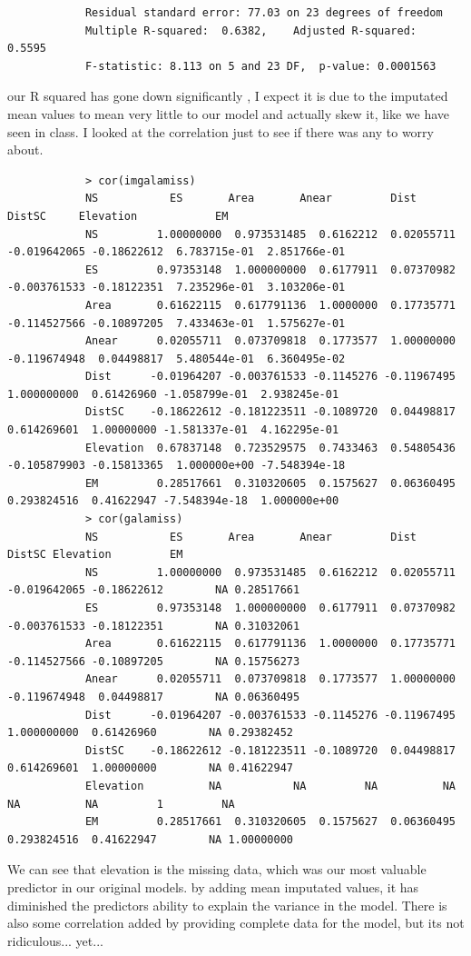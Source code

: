 \documentclass[11pt]{article}
\begin{document}
\begin{enumerate}
\begin{enumerate}
\begin{enumerate}
\begin{verbatim}
			Residual standard error: 77.03 on 23 degrees of freedom
			Multiple R-squared:  0.6382,	Adjusted R-squared:  0.5595 
			F-statistic: 8.113 on 5 and 23 DF,  p-value: 0.0001563
		\end{verbatim}
		our R squared has gone down significantly , I expect it is due to the imputated mean values to mean very little to our model and actually skew it, like we have seen in class.
		I looked at the correlation just to see if there was any to worry about.
		\begin{verbatim}
			> cor(imgalamiss)
			NS           ES       Area       Anear         Dist      DistSC     Elevation            EM
			NS         1.00000000  0.973531485  0.6162212  0.02055711 -0.019642065 -0.18622612  6.783715e-01  2.851766e-01
			ES         0.97353148  1.000000000  0.6177911  0.07370982 -0.003761533 -0.18122351  7.235296e-01  3.103206e-01
			Area       0.61622115  0.617791136  1.0000000  0.17735771 -0.114527566 -0.10897205  7.433463e-01  1.575627e-01
			Anear      0.02055711  0.073709818  0.1773577  1.00000000 -0.119674948  0.04498817  5.480544e-01  6.360495e-02
			Dist      -0.01964207 -0.003761533 -0.1145276 -0.11967495  1.000000000  0.61426960 -1.058799e-01  2.938245e-01
			DistSC    -0.18622612 -0.181223511 -0.1089720  0.04498817  0.614269601  1.00000000 -1.581337e-01  4.162295e-01
			Elevation  0.67837148  0.723529575  0.7433463  0.54805436 -0.105879903 -0.15813365  1.000000e+00 -7.548394e-18
			EM         0.28517661  0.310320605  0.1575627  0.06360495  0.293824516  0.41622947 -7.548394e-18  1.000000e+00
			> cor(galamiss)
			NS           ES       Area       Anear         Dist      DistSC Elevation         EM
			NS         1.00000000  0.973531485  0.6162212  0.02055711 -0.019642065 -0.18622612        NA 0.28517661
			ES         0.97353148  1.000000000  0.6177911  0.07370982 -0.003761533 -0.18122351        NA 0.31032061
			Area       0.61622115  0.617791136  1.0000000  0.17735771 -0.114527566 -0.10897205        NA 0.15756273
			Anear      0.02055711  0.073709818  0.1773577  1.00000000 -0.119674948  0.04498817        NA 0.06360495
			Dist      -0.01964207 -0.003761533 -0.1145276 -0.11967495  1.000000000  0.61426960        NA 0.29382452
			DistSC    -0.18622612 -0.181223511 -0.1089720  0.04498817  0.614269601  1.00000000        NA 0.41622947
			Elevation          NA           NA         NA          NA           NA          NA         1         NA
			EM         0.28517661  0.310320605  0.1575627  0.06360495  0.293824516  0.41622947        NA 1.00000000
		\end{verbatim}
		We can see that elevation is the missing data, which was our most valuable predictor in our original models. by adding mean imputated values, it has diminished the predictors ability to explain the variance in the model. There is also some correlation added by providing complete data for the model, but its not ridiculous... yet...

\end{enumerate}
\end{enumerate}
\end{enumerate}
\end{document}
